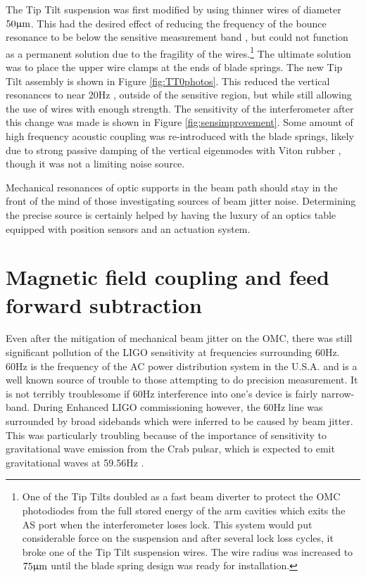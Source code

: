 The Tip Tilt suspension was first modified by using thinner wires of diameter $50 \upmu \rm m$. %
This had the desired effect of reducing the frequency of the bounce resonance to be below the sensitive measurement band \cite{smallwirecoupling}, but could not function as a permanent solution due to the fragility of the wires.\footnote{One of the Tip Tilts doubled as a fast beam diverter to protect the OMC photodiodes from the full stored energy of the arm cavities which exits the AS port when the interferometer loses lock. %
This system would put considerable force on the suspension and after several lock loss cycles, it broke one of the Tip Tilt suspension wires. %
The wire radius was increased to $75 \upmu \rm m$ until the blade spring design was ready for installation.} The ultimate solution was to place the upper wire clamps at the ends of blade springs. %
The new Tip Tilt assembly is shown in Figure \ref{fig:TT0photos}. %
This reduced the vertical resonances to near 20Hz \cite{bladebounce,bladebounceLHO}, outside of the sensitive region, but while still allowing the use of wires with enough strength. %
The sensitivity of the interferometer after this change was made is shown in Figure \ref{fig:sensimprovement}. %
Some amount of high frequency acoustic coupling was re-introduced with the blade springs, likely due to strong passive damping of the vertical eigenmodes with Viton rubber \cite{G1100330}, though it was not a limiting noise source.

Mechanical resonances of optic supports in the beam path should stay in the front of the mind of those investigating sources of beam jitter noise. %
Determining the precise source is certainly helped by having the luxury of an optics table equipped with position sensors and an actuation system.
\section{Magnetic field coupling and feed forward subtraction}
Even after the mitigation of mechanical beam jitter on the OMC, there was still significant pollution of the LIGO sensitivity at frequencies surrounding 60Hz. %
60Hz is the frequency of the AC power distribution system in the U.S.A. %
and is a well known source of trouble to those attempting to do precision measurement. %
It is not terribly troublesome if 60Hz interference into one's device is fairly narrow-band. %
During Enhanced LIGO commissioning however, the 60Hz line was surrounded by broad sidebands which were inferred to be caused by beam jitter. %
This was particularly troubling because of the importance of sensitivity to gravitational wave emission from the Crab pulsar, which is expected to emit gravitational waves at 59.56Hz \cite{Crab}.

